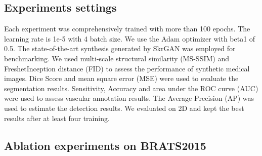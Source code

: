 \documentclass[runningheads]{llncs}
\begin{document}
	\subsection{Experiments settings}
	Each experiment was comprehensively trained with more than 100 epochs. The learning rate is 1e-5 with 4 batch size. We use the Adam optimizer with beta1 of 0.5.
	The state-of-the-art synthesis generated by SkrGAN\cite{96zhang2019skrgan:} was employed for benchmarking. We used multi-scale structural similarity (MS-SSIM) and FreshetInception distance (FID)\cite{148karras2017progressive} to assess the performance of synthetic medical images. Dice Score\cite {95dice1945measures} and mean square error (MSE) were used to evaluate the segmentation results. Sensitivity, Accuracy and area under the ROC curve (AUC) were used to assess vascular annotation results. The Average Precision (AP) was used to estimate the detection results. We evaluated on  2D and kept the best results after at least four training.
	
	\subsection{Ablation experiments on BRATS2015}
	
\end{document}
